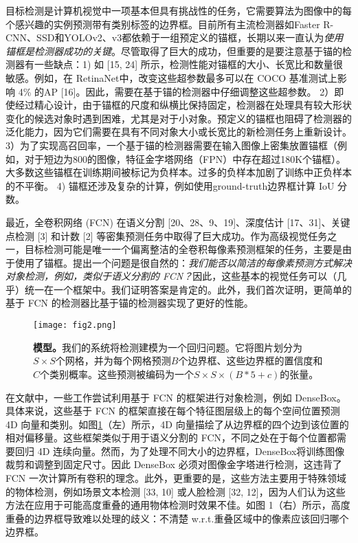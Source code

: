 \documentclass[../main.tex]{subfile}
\begin{document}
目标检测是计算机视觉中一项基本但具有挑战性的任务，它需要算法为图像中的每个感兴趣的实例预测带有类别标签的边界框。目前所有主流检测器如Faster R-CNN\cite{fasterrcnn}、SSD\cite{ssd}和YOLOv2、v3\cite{yolov3}都依赖于一组预定义的锚框，长期以来一直认为\textit{使用锚框是检测器成功的关键}。尽管取得了巨大的成功，但重要的是要注意基于锚的检测器有一些缺点：1) 如 [15, 24] 所示，检测性能对锚框的大小、长宽比和数量很敏感。例如，在 RetinaNet\cite{retinanet}中，改变这些超参数最多可以在 COCO 基准测试上影响 4\% 的AP [16]。因此，需要在基于锚的检测器中仔细调整这些超参数。 2）即使经过精心设计，由于锚框的尺度和纵横比保持固定，检测器在处理具有较大形状变化的候选对象时遇到困难，尤其是对于小对象。预定义的锚框也阻碍了检测器的泛化能力，因为它们需要在具有不同对象大小或长宽比的新检测任务上重新设计。 3）为了实现高召回率，一个基于锚的检测器需要在输入图像上密集放置锚框（例如，对于短边为800的图像，特征金字塔网络（FPN）\cite{fpn}中存在超过180K个锚框）。大多数这些锚框在训练期间被标记为负样本。过多的负样本加剧了训练中正负样本的不平衡。 4) 锚框还涉及复杂的计算，例如使用ground-truth边界框计算 IoU 分数。

最近，全卷积网络 (FCN) \cite{fcn} 在语义分割 [20、28、9、19]、深度估计 [17、31]、关键点检测 [3] 和计数 [2] 等密集预测任务中取得了巨大成功。作为高级视觉任务之一，目标检测可能是唯一一个偏离整洁的全卷积每像素预测框架的任务，主要是由于使用了锚框。提出一个问题是很自然的：\textit{我们能否以简洁的每像素预测方式解决对象检测，例如，类似于语义分割的 FCN？}因此，这些基本的视觉任务可以（几乎）统一在一个框架中。我们证明答案是肯定的。此外，我们首次证明，更简单的基于 FCN 的检测器比基于锚的检测器实现了更好的性能。

\begin{figure}[htb]
    \centering
    \texttt{[image: fig2.png]}
    \caption{\textbf{模型。}我们的系统将检测建模为一个回归问题。它将图片划分为$S\times S$个网格，并为每个网格预测$B$个边界框、这些边界框的置信度和$C$个类别概率。这些预测被编码为一个$S\times S \times \left( B \ast 5 + c \right)$的张量。}
    \label{fig:fig1}
\end{figure}

在文献中，一些工作尝试利用基于 FCN 的框架进行对象检测，例如 DenseBox\cite{densebox}。具体来说，这些基于 FCN 的框架直接在每个特征图层级上的每个空间位置预测 4D 向量和类别。如图\ref{fig:fig1}（左）所示，4D 向量描绘了从边界框的四个边到该位置的相对偏移量。这些框架类似于用于语义分割的 FCN，不同之处在于每个位置都需要回归 4D 连续向量。然而，为了处理不同大小的边界框，DenseBox\cite{densebox}将训练图像裁剪和调整到固定尺寸。因此 DenseBox 必须对图像金字塔进行检测，这违背了 FCN 一次计算所有卷积的理念。此外，更重要的是，这些方法主要用于特殊领域的物体检测，例如场景文本检测 [33, 10] 或人脸检测 [32, 12]，因为人们认为这些方法在应用于可能高度重叠的通用物体检测时效果不佳。如图 1（右）所示，高度重叠的边界框导致难以处理的歧义：不清楚 w.r.t.重叠区域中的像素应该回归哪个边界框。
\end{document}
